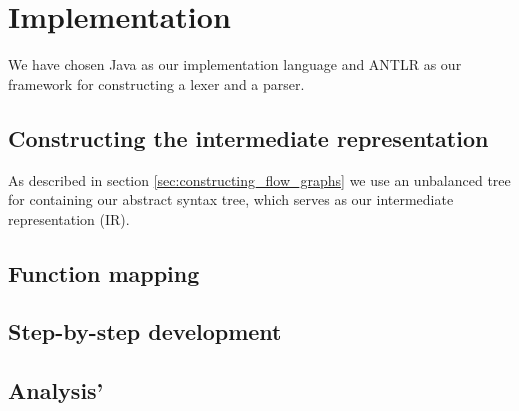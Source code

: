 \section{Implementation}
We have chosen Java as our implementation language and ANTLR as our framework for constructing a lexer and a parser.

\subsection{Constructing the intermediate representation}
As described in section \ref{sec:constructing_flow_graphs} we use an unbalanced tree for containing our abstract syntax tree, which serves as our intermediate representation (IR).

\subsection{Function mapping}

\subsection{Step-by-step development}


\subsection{Analysis' }
